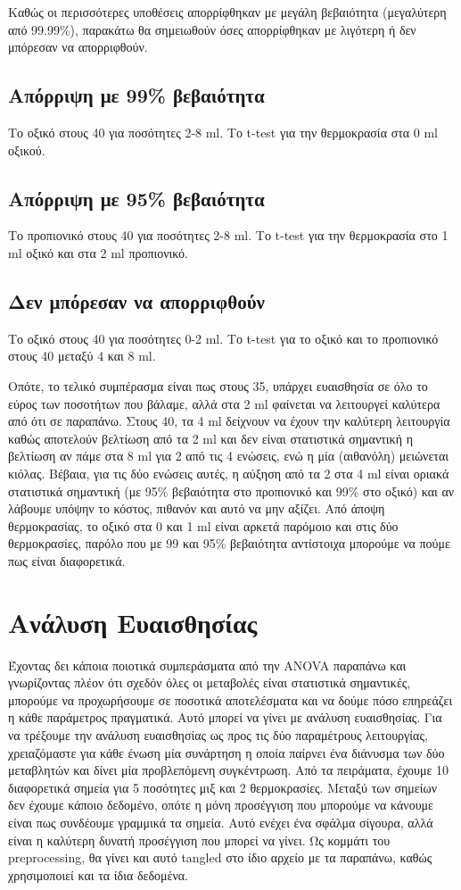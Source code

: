 \documentclass[11pt]{article}
\begin{document}
Καθώς οι περισσότερες υποθέσεις απορρίφθηκαν με μεγάλη βεβαιότητα (μεγαλύτερη από 99.99\%), παρακάτω θα σημειωθούν όσες απορρίφθηκαν με λιγότερη ή δεν μπόρεσαν να απορριφθούν.

\subsection{Απόρριψη με 99\% βεβαιότητα}
\label{sec:orgbb3e827}
Το οξικό στους 40 για ποσότητες 2-8 ml.
Το t-test για την θερμοκρασία στα 0 ml οξικού.

\subsection{Απόρριψη με 95\% βεβαιότητα}
\label{sec:orgcc1c06a}
Το προπιονικό στους 40 για ποσότητες 2-8 ml.
Το t-test για την θερμοκρασία στο 1 ml οξικό και στα 2 ml προπιονικό.

\subsection{Δεν μπόρεσαν να απορριφθούν}
\label{sec:org44e8294}
Το οξικό στους 40 για ποσότητες 0-2 ml.
Το t-test για το οξικό και το προπιονικό στους 40 μεταξύ 4 και 8 ml.

Οπότε, το τελικό συμπέρασμα είναι πως στους 35, υπάρχει ευαισθησία σε όλο το εύρος των ποσοτήτων που βάλαμε, αλλά στα 2 ml φαίνεται να λειτουργεί καλύτερα από ότι σε παραπάνω. Στους 40, τα 4 ml δείχνουν να έχουν την καλύτερη λειτουργία καθώς αποτελούν βελτίωση από τα 2 ml και δεν είναι στατιστικά σημαντική η βελτίωση αν πάμε στα 8 ml για 2 από τις 4 ενώσεις, ενώ η μία (αιθανόλη) μειώνεται κιόλας. Βέβαια, για τις δύο ενώσεις αυτές, η αύξηση από τα 2 στα 4 ml είναι οριακά στατιστικά σημαντική (με 95\% βεβαιότητα στο προπιονικό και 99\% στο οξικό) και αν λάβουμε υπόψην το κόστος, πιθανόν και αυτό να μην αξίζει. Από άποψη θερμοκρασίας, το οξικό στα 0 και 1 ml είναι αρκετά παρόμοιο και στις δύο θερμοκρασίες, παρόλο που με 99 και 95\% βεβαιότητα αντίστοιχα μπορούμε να πούμε πως είναι διαφορετικά. 

\section{Ανάλυση Ευαισθησίας}
\label{sec:org1890ff9}
Έχοντας δει κάποια ποιοτικά συμπεράσματα από την ANOVA παραπάνω και γνωρίζοντας πλέον ότι σχεδόν όλες οι μεταβολές είναι στατιστικά σημαντικές, μπορούμε να προχωρήσουμε σε ποσοτικά αποτελέσματα και να δούμε πόσο επηρεάζει η κάθε παράμετρος πραγματικά. Αυτό μπορεί να γίνει με ανάλυση ευαισθησίας. Για να τρέξουμε την ανάλυση ευαισθησίας ως προς τις δύο παραμέτρους λειτουργίας, χρειαζόμαστε για κάθε ένωση μία συνάρτηση η οποία παίρνει ένα διάνυσμα των δύο μεταβλητών και δίνει μία προβλεπόμενη συγκέντρωση. Από τα πειράματα, έχουμε 10 διαφορετικά σημεία για 5 ποσότητες μιξ και 2 θερμοκρασίες. Μεταξύ των σημείων δεν έχουμε κάποιο δεδομένο, οπότε η μόνη προσέγγιση που μπορούμε να κάνουμε είναι πως συνδέουμε γραμμικά τα σημεία. Αυτό ενέχει ένα σφάλμα σίγουρα, αλλά είναι η καλύτερη δυνατή προσέγγιση που μπορεί να γίνει. Ως κομμάτι του preprocessing, θα γίνει και αυτό tangled στο ίδιο αρχείο με τα παραπάνω, καθώς χρησιμοποιεί και τα ίδια δεδομένα.
\end{document}
